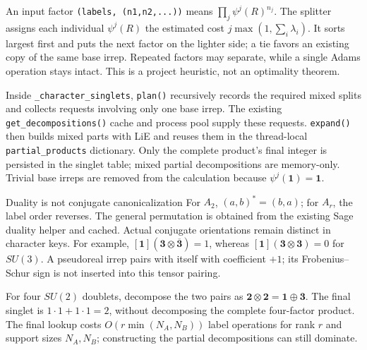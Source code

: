 \documentclass[11pt,a4paper]{article}
\numberwithin{equation}{section}
\newcommand{\code}[1]{{\small\nolinkurl{#1}}}
\begin{document}
An input factor \code{(labels, (n1,n2,...))} means
$\prod_j\psi^j(R)^{n_j}$. The splitter assigns each individual $\psi^j(R)$ the
estimated cost $j\max(1,\sum_i\lambda_i)$. It sorts largest first and puts the
next factor on the lighter side; a tie favors an existing copy of the same base
irrep. Repeated factors may separate, while a single Adams operation stays intact.
This is a project heuristic, not an optimality theorem.

Inside \code{_character_singlets}, \code{plan()} recursively records the required
mixed splits and collects requests involving only one base irrep. The existing
\code{get_decompositions()} cache and process pool supply these requests.
\code{expand()} then builds mixed parts with LiE and reuses them in the
thread-local \code{partial_products} dictionary. Only the complete product's
final integer is persisted in the singlet table; mixed partial decompositions
are memory-only. Trivial base irreps are removed from the calculation because
$\psi^j(\mathbf1)=\mathbf1$.

\begin{note}{Duality is not conjugate canonicalization}
For $A_2$, $(a,b)^*=(b,a)$; for $A_r$, the label order reverses. The general
permutation is obtained from the existing Sage duality helper and cached.
Actual conjugate orientations remain distinct in character keys. For example,
$[\mathbf1](\mathbf3\otimes\overline{\mathbf3})=1$, whereas
$[\mathbf1](\mathbf3\otimes\mathbf3)=0$ for $SU(3)$.
A pseudoreal irrep pairs with itself with coefficient $+1$; its
Frobenius--Schur sign is not inserted into this tensor pairing.
\end{note}
For four $SU(2)$ doublets, decompose the two pairs as
$\mathbf2\otimes\mathbf2=\mathbf1\oplus\mathbf3$. The final singlet is
$1\cdot1+1\cdot1=2$, without decomposing the complete four-factor product.
The final lookup costs $O(r\min(N_A,N_B))$ label operations for rank $r$ and
support sizes $N_A,N_B$; constructing the partial decompositions can still dominate.

\clearpage
\end{document}
